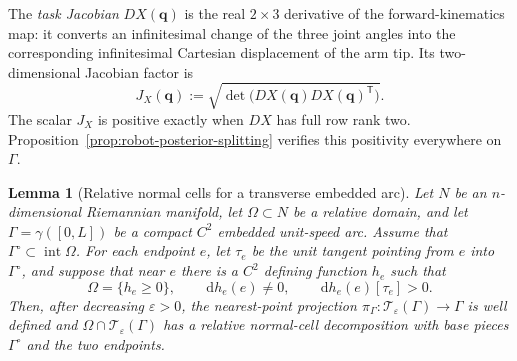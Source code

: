 \documentclass[11pt]{amsart}
\numberwithin{equation}{section}
\newtheorem{lemma}[theorem]{Lemma}
\theoremstyle{definition}
\theoremstyle{remark}
\newcommand{\dd}{\,\mathrm{d}}
\newcommand{\eps}{\varepsilon}
\newcommand{\cT}{\mathcal{T}}
\begin{document}
The \emph{task Jacobian} $DX(\bm q)$ is the real $2\times3$ derivative of the
forward-kinematics map: it converts an infinitesimal change of the three joint
angles into the corresponding infinitesimal Cartesian displacement of the
arm tip.  Its two-dimensional Jacobian factor is
\begin{equation}\label{eq:robot-task-jacobian}
 J_X(\bm q):=\sqrt{\det\bigl(DX(\bm q)DX(\bm q)^{\mathsf T}\bigr)}.
\end{equation}
The scalar $J_X$ is positive exactly when $DX$ has full row rank two.
Proposition~\ref{prop:robot-posterior-splitting} verifies this positivity
everywhere on $\Gamma$.

\begin{lemma}[Relative normal cells for a transverse embedded arc]
\label{lem:transverse-arc-normal-cells}
Let $N$ be an $n$-dimensional Riemannian manifold, let $\Omega\subset N$ be a
relative domain, and let $\Gamma=\gamma([0,L])$ be a compact $C^2$ embedded
unit-speed arc.  Assume that $\Gamma^\circ\subset\operatorname{int}\Omega$.
For each endpoint $e$, let $\tau_e$ be the unit tangent pointing from $e$ into
$\Gamma^\circ$, and suppose that near $e$ there is a $C^2$ defining function
$h_e$ such that
\[
 \Omega=\{h_e\ge0\},\qquad \dd h_e(e)\ne0,
 \qquad \dd h_e(e)[\tau_e]>0.
\]
Then, after decreasing $\eps>0$, the nearest-point projection
$\pi_\Gamma:\cT_\eps(\Gamma)\to\Gamma$ is well defined and
$\Omega\cap\cT_\eps(\Gamma)$ has a relative normal-cell decomposition with
base pieces $\Gamma^\circ$ and the two endpoints.


\end{lemma}
\end{document}
